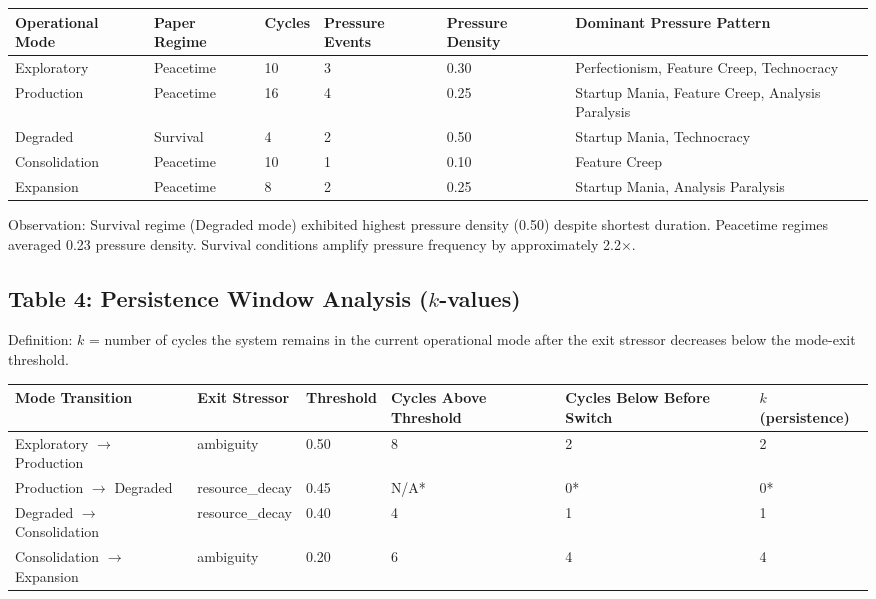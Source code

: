 \documentclass[11pt,a4paper]{article}
\begin{document}
\begin{center}
\begin{tabular}{llllll}
\toprule
\textbf{Operational Mode} & \textbf{Paper Regime} & \textbf{Cycles} & \textbf{Pressure Events} & \textbf{Pressure Density} & \textbf{Dominant Pressure Pattern} \\
\midrule
Exploratory & Peacetime & 10 & 3 & 0.30 & Perfectionism, Feature Creep, Technocracy \\
Production & Peacetime & 16 & 4 & 0.25 & Startup Mania, Feature Creep, Analysis Paralysis \\
Degraded & Survival & 4 & 2 & 0.50 & Startup Mania, Technocracy \\
Consolidation & Peacetime & 10 & 1 & 0.10 & Feature Creep \\
Expansion & Peacetime & 8 & 2 & 0.25 & Startup Mania, Analysis Paralysis \\
\bottomrule
\end{tabular}
\end{center}

Observation: Survival regime (Degraded mode) exhibited highest pressure density (0.50) despite shortest duration. Peacetime regimes averaged 0.23 pressure density. Survival conditions amplify pressure frequency by approximately 2.2$\times$.

\subsection*{Table 4: Persistence Window Analysis ($k$-values)}

Definition: $k$ = number of cycles the system remains in the current operational mode after the exit stressor decreases below the mode-exit threshold.

\begin{center}
\begin{tabular}{llllll}
\toprule
\textbf{Mode Transition} & \textbf{Exit Stressor} & \textbf{Threshold} & \textbf{Cycles Above Threshold} & \textbf{Cycles Below Before Switch} & \textbf{$k$ (persistence)} \\
\midrule
Exploratory $\to$ Production & ambiguity & 0.50 & 8 & 2 & 2 \\
Production $\to$ Degraded & resource\_decay & 0.45 & N/A* & 0* & 0* \\
Degraded $\to$ Consolidation & resource\_decay & 0.40 & 4 & 1 & 1 \\
Consolidation $\to$ Expansion & ambiguity & 0.20 & 6 & 4 & 4 \\
\bottomrule
\end{tabular}
\end{center}
\end{document}
